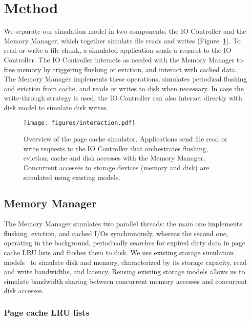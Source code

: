 \documentclass[conference]{IEEEtran}
\begin{document}
    \section{Method}
    \label{method}
    We separate our simulation model in two components, the IO
    Controller and the Memory Manager, which together simulate 
    file reads and writes (Figure~\ref{fig:interaction}). 
    To read or write a file chunk, a simulated application sends a
    request to the IO Controller. The IO Controller interacts as needed with
    the Memory Manager to free memory by triggering flushing or eviction,
    and interact with cached data. The Memory Manager
    implements these operations, simulates periodical flushing
    and eviction from cache, and reads or writes to disk when necessary.
    In case the write-through strategy is used, the IO Controller can also interact directly 
    with disk model to simulate disk writes.
    
    \begin{figure}
           \centering
           \texttt{[image: figures/interaction.pdf]}
           \caption{Overview of the page cache simulator.
           Applications send file read or write requests to the
           IO Controller that orchestrates flushing, eviction, cache
           and disk accesses with the Memory Manager. Concurrent accesses to storage
           devices (memory and disk) are simulated using existing models.}
           \label{fig:interaction}
    \end{figure}

    \subsection{Memory Manager}

    The Memory Manager simulates two parallel threads: the main one
    implements flushing, eviction, and cached I/Os synchronously, whereas
    the second one, operating in the background, periodically searches for
    expired dirty data in page cache LRU lists and flushes them to disk. We
    use existing storage simulation models~\cite{lebre2015} to simulate disk and
    memory, characterized by its storage capacity, read and write
    bandwidths, and latency. Reusing existing storage models allows us to
    simulate bandwidth sharing between concurrent memory accesses and concurrent disk accesses.

    \subsubsection{Page cache LRU lists}
\end{document}
